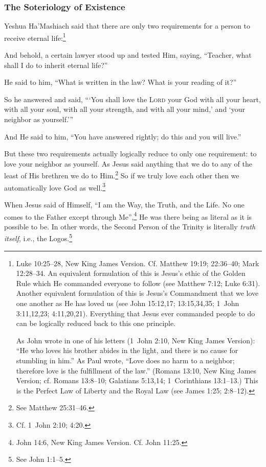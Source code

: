 \documentclass[letterpaper,12pt]{article}
\newenvironment{squotation}
  {\small\quotation}
  {\endquotation\normalsize}
\begin{document}
\subsubsection{The Soteriology of Existence}
\label{subsubsec:SoteriologyOfExistence}

Yeshua Ha'Mashiach said that there are only two requirements for a person to receive eternal life:\footnote{\label{foot:GoldenRule}Luke 10:25--28, New King James Version. Cf. Matthew 19:19; 22:36--40; Mark 12:28--34. An equivalent formulation of this is Jesus's ethic of the Golden Rule which He commanded everyone to follow (see Matthew 7:12; Luke 6:31). Another equivalent formulation of this is Jesus's Commandment that we love one another as He has loved us (see John 15:12,17; 13:15,34,35; 1~John 3:11,12,23; 4:11,20,21). Everything that Jesus ever commanded people to do can be logically reduced back to this one principle.\par
    As John wrote in one of his letters (1~John 2:10, New King James Version): ``He who loves his brother abides in the light, and there is no cause for stumbling in him.'' As Paul wrote, ``Love does no harm to a neighbor; therefore love is the fulfillment of the law.'' (Romans 13:10, New King James Version; cf. Romans 13:8--10; Galatians 5:13,14; 1~Corinthians 13:1--13.) This is the Perfect Law of Liberty and the Royal Law (see James 1:25; 2:8--12).}

\begin{squotation}
And behold, a certain lawyer stood up and tested Him, saying, ``Teacher, what shall I do to inherit eternal life?''

He said to him, ``What is written in the law? What is your reading of it?''

So he answered and said, ``\thinspace`You shall love the \textsc{Lord} your God with all your heart, with all your soul, with all your strength, and with all your mind,' and `your neighbor as yourself.'\thinspace''

And He said to him, ``You have answered rightly; do this and you will live.''
\end{squotation}

But these two requirements actually logically reduce to only one requirement: to love your neighbor as yourself. As Jesus said anything that we do to any of the least of His brethren we do to Him.\footnote{See Matthew 25:31--46.} So if we truly love each other then we automatically love God as well.\footnote{Cf. 1~John 2:10; 4:20.}

When Jesus said of Himself, ``I am the Way, the Truth, and the Life. No one comes to the Father except through Me'',\footnote{John 14:6, New King James Version. Cf. John 11:25.} He was there being as literal as it is possible to be. In other words, the Second Person of the Trinity is literally \emph{truth itself}, i.e., the Logos.\footnote{See John 1:1--5.}
\end{document}
